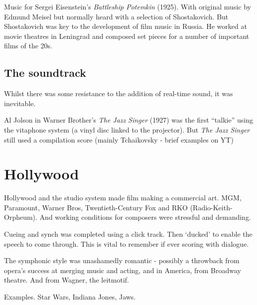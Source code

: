 Music for Sergei Eisenstein's \textit{Battleship Potemkin} (1925). With original music by Edmund Meisel but normally heard with a selection of Shostakovich. 
But Shostakovich was key to the development of film music in Russia. He worked at movie theatres in Leningrad and composed set pieces for a number of important films of the 20s. 

\subsection{The soundtrack}
Whilst there was some resistance to the addition of real-time sound, it was inevitable. 

Al Jolson in Warner Brother's \textit{The Jazz Singer} (1927) was the first ``talkie'' using the vitaphone system (a vinyl disc linked to the projector).
But \textit{The Jazz Singer} still used a compilation score (mainly Tchaikovsky - brief examples on YT) 


\section{Hollywood}

Hollywood and the studio system made film making a commercial art. MGM, Paramount, Warner Bros, Twentieth-Century Fox and RKO (Radio-Keith-Orpheum). And working conditions for composers were stressful and demanding. 

Cueing and synch was completed using a click track. Then `ducked' to enable the speech to come through. This is vital to remember if ever scoring with dialogue. 


The symphonic style was unashamedly romantic - possibly a throwback from opera's success at merging music and acting, and in America, from Broadway theatre. And from Wagner, the leitmotif. 

Examples. Star Wars, Indiana Jones, Jaws. 

